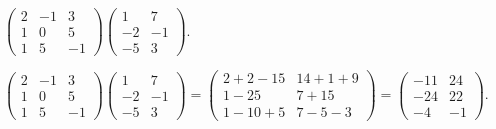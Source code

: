 \documentclass{ximera}
\begin{document}
\begin{exercise}  \label{c4.6.0d}
$\left(\begin{array}{rrr} 2 & -1 & 3\\ 1 & 0 & 5\\1 & 5 & -1\end{array}\right)
\left(\begin{array}{rrr} 1 & 7 \\ -2 & -1 \\ -5 & 3\end{array}\right)$.

\begin{solution}
\soln
$\left(\begin{array}{rrr} 2 &  -1 &3\\ 1 & 0 & 5 \\1 & 5 & -1
\end{array}\right)
\left(\begin{array}{rrr} 1 & 7 \\ -2 & -1 \\ -5 & 3\end{array}\right)
= \left(\begin{array}{cc} 2+2-15 & 14+1+9 \\ 1-25 & 7+15 \\
1-10+5 & 7-5-3 \end{array}\right)
= \left(\begin{array}{rr} -11 & 24 \\ -24 & 22 \\ -4 & -1
\end{array}\right)$.
\end{solution}
\end{exercise}
\end{document}

